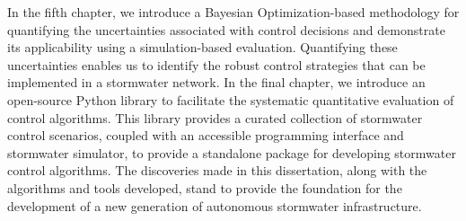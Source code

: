 In the fifth chapter, we introduce a Bayesian Optimization-based methodology for quantifying the uncertainties associated with control decisions and demonstrate its applicability using a simulation-based evaluation.
Quantifying these uncertainties enables us to identify the robust control strategies that can be implemented in a stormwater network.
In the final chapter, we introduce an open-source Python library to facilitate the systematic quantitative evaluation of control algorithms.
This library provides a curated collection of stormwater control scenarios, coupled with an accessible programming interface and stormwater simulator, to provide a standalone package for developing stormwater control algorithms.
The discoveries made in this dissertation, along with the algorithms and tools developed, stand to provide the foundation for the development of a new generation of autonomous stormwater infrastructure.
\endgroup

\vfill
